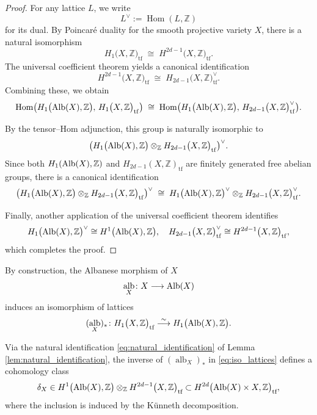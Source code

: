 \documentclass[11pt,letterpaper]{amsart}
\newcommand{\Alb}{\textnormal{Alb}}
\numberwithin{equation}{section}
\theoremstyle{definition}
\theoremstyle{remark}
\newcommand{\Z}{\mathbb{Z}}
\newcommand{\tf}{\text{tf}}
\DeclareMathOperator{\al}{alb}
\DeclareMathOperator{\Hom}{Hom}
\begin{document}
\begin{proof} For any lattice $L$, we write
$$
L^\vee := \Hom(L, \mathbb{Z})
$$
for its dual. By Poincar\'e duality for the smooth projective variety $X$, there is a natural
isomorphism
$$
H_{1}\bigl(X,\Z\bigr)_{\mathrm{tf}} \;\cong\; H^{2d-1}\bigl(X,\Z\bigr)_{\mathrm{tf}} .
$$
The universal coefficient
theorem yields a canonical identification
$$
H^{2d-1}\bigl(X,\Z\bigr)_{\mathrm{tf}}
\;\cong\;
H_{2d-1}\bigl(X,\Z\bigr)_{\mathrm{tf}}^\vee.
$$
Combining these, we obtain
$$
\Hom\bigl(H_{1}\bigl(\Alb(X),\Z\bigr),\, H_{1}\bigl(X,\Z\bigr)_{\mathrm{tf}}\bigr)
\;\cong\;
\Hom\bigl(H_{1}\bigl(\Alb(X),\Z\bigr),\, H_{2d-1}\bigl(X,\Z\bigr)_{\mathrm{tf}}^\vee\bigr).
$$

By the tensor--Hom adjunction, this group is naturally isomorphic to
$$
\bigl(H_{1}\bigl(\Alb(X),\Z\bigr)\otimes_{\Z} H_{2d-1}\bigl(X,\Z\bigr)_{\mathrm{tf}}\bigr)^\vee.
$$
Since both $H_{1}(\Alb(X),\Z)$ and $H_{2d-1}(X,\Z)_{\mathrm{tf}}$ are finitely generated
free abelian groups, there is a canonical identification
$$
\bigl(H_{1}\bigl(\Alb(X),\Z\bigr)\otimes_{\Z} H_{2d-1}\bigl(X,\Z\bigr)_{\mathrm{tf}}\bigr)^\vee
\;\cong\;
H_{1}\bigl(\Alb(X),\Z\bigr)^\vee
\otimes_{\Z}
H_{2d-1}\bigl(X,\Z\bigr)_{\mathrm{tf}}^\vee.
$$

Finally, another application of the universal coefficient theorem identifies
$$
H_{1}\bigl(\Alb(X),\Z\bigr)^\vee\cong H^{1}\bigl(\Alb(X),\Z\bigr),
\quad
H_{2d-1}\bigl(X,\Z\bigr)_{\mathrm{tf}}^\vee\cong H^{2d-1}\bigl(X,\Z\bigr)_{\mathrm{tf}},
$$
which completes the proof.
\end{proof}

By construction, the Albanese morphism of $X$
\begin{equation}\label{eq:al_X}
    \al_{X}\colon X\longrightarrow\Alb(X)
\end{equation}
induces an isomorphism of lattices 
\begin{equation}\label{eq:iso_lattices}
    (\al_{X})_{\ast}\colon H_{1}\bigl(X,\Z\bigr)_{\tf}\overset{\sim}{\longrightarrow}H_{1}\bigl(\Alb(X),\Z\bigr).
\end{equation}
\par
Via the natural identification \eqref{eq:natural_identification} of Lemma \ref{lem:natural_identification}, the inverse of $(\al_{X})_{\ast}$ in \eqref{eq:iso_lattices} defines a cohomology class 
\begin{equation}\label{eq:Hodge_class}\delta_{X}\in H^{1}\bigl(\Alb(X),\Z\bigr)\otimes_{\Z} H^{2d-1}\bigl(X,\Z\bigr)_{\tf}\subset H^{2d}\bigl(\Alb(X)\times X,\Z\bigr)_{\text{tf}},\end{equation}
where the inclusion is induced by the Künneth decomposition.\par
\end{document}
